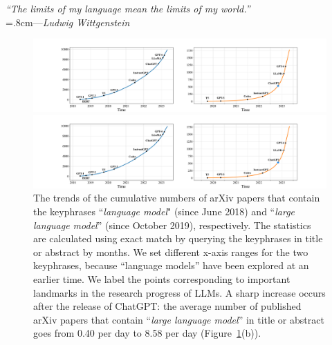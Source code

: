 






\begin{flushright}
\rightskip=0.8cm\textit{``The limits of my language mean the limits of my world.''} \\
\vspace{.2em}
\rightskip=.8cm---\emph{Ludwig Wittgenstein}
\end{flushright}
\vspace{1em}


\begin{figure}[h]
    \centering
    \begin{minipage}{0.45\textwidth}
           \includegraphics[width=\textwidth]{images/paper_number1.pdf}
        \end{minipage}
        \qquad
        \begin{minipage}{0.45\textwidth}
           \includegraphics[width=\textwidth]{images/paper_number2.pdf}
    \end{minipage}
    \caption{{The trends of the  cumulative numbers  of arXiv papers that contain  the keyphrases  ``\emph{language model}" (since June 2018)  and ``\emph{large language model}'' (since October 2019), respectively. The statistics are calculated using   exact match by querying the keyphrases in title or abstract by months. We set different x-axis ranges for the two keyphrases, because ``language models'' have been explored at an earlier time.  We label the points corresponding to  important landmarks in the research progress of LLMs. A sharp increase occurs after the release of ChatGPT: the average number of published  arXiv papers that contain ``\emph{large language model}'' in title or abstract goes from 0.40 per day to 8.58 per day (Figure~\ref{fig:paper_number}(b)). }}
    \label{fig:paper_number}
\end{figure}

